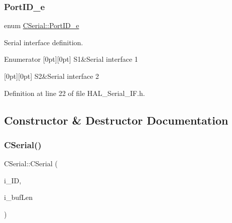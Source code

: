 \subsubsection{\texorpdfstring{Port\+I\+D\+\_\+e}{PortID\_e}}
{\footnotesize\ttfamily enum \mbox{\hyperlink{class_c_serial_a000039540cc90b18bafacf5744e7eda2}{C\+Serial\+::\+Port\+I\+D\+\_\+e}}}



Serial interface definition. 

\begin{DoxyEnumFields}{Enumerator}
[0pt][0pt]{}\mbox{\label{class_c_serial_a000039540cc90b18bafacf5744e7eda2a2a245d3c55e5b6e7052daf261924ce08}} 
S1&Serial interface 1 \\
\hline

[0pt][0pt]{}\mbox{\label{class_c_serial_a000039540cc90b18bafacf5744e7eda2a8cc95f4591147b0df028e003f82220a1}} 
S2&Serial interface 2 \\
\hline

\end{DoxyEnumFields}


Definition at line 22 of file H\+A\+L\+\_\+\+Serial\+\_\+\+I\+F.\+h.



\subsection{Constructor \& Destructor Documentation}
\mbox{\label{class_c_serial_a3b2b31de1529b884b8d5e354586ee981}} 
\subsubsection{\texorpdfstring{C\+Serial()}{CSerial()}}
{\footnotesize\ttfamily C\+Serial\+::\+C\+Serial (\begin{DoxyParamCaption}\item[{\mbox{\hyperlink{class_c_serial_a000039540cc90b18bafacf5744e7eda2}{Port\+I\+D\+\_\+e}}}]{i\+\_\+\+ID,  }\item[{\mbox{\hyperlink{_a_d_a_s___types_8h_a1f1825b69244eb3ad2c7165ddc99c956}{uint16\+\_\+t}}}]{i\+\_\+buf\+Len }\end{DoxyParamCaption})}



